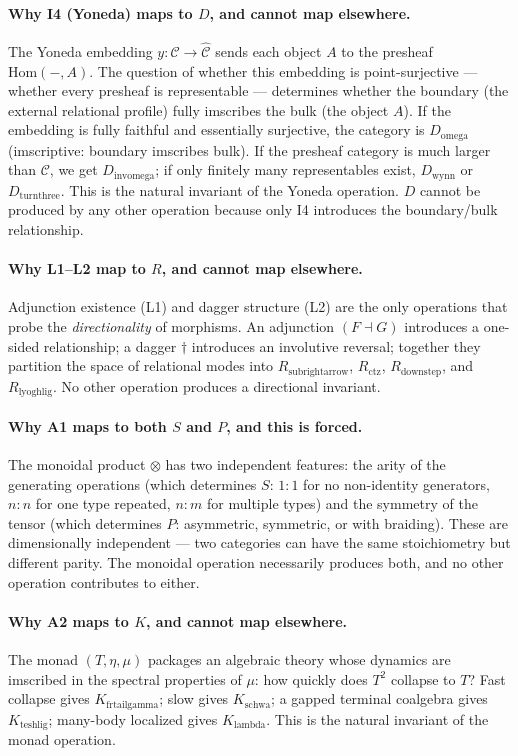 \documentclass[12pt,a4paper]{article}
\begin{document}
\paragraph{Why I4 (Yoneda) maps to $D$, and cannot map elsewhere.}
The Yoneda embedding $y: \mathcal{C} \to \hat{\mathcal{C}}$ sends each object $A$ to the presheaf $\text{Hom}(-,A)$. The question of whether this embedding is point-surjective --- whether every presheaf is representable --- determines whether the boundary (the external relational profile) fully imscribes the bulk (the object $A$). If the embedding is fully faithful and essentially surjective, the category is $D_{\text{omega}}$ (imscriptive: boundary imscribes bulk). If the presheaf category is much larger than $\mathcal{C}$, we get $D_{\text{invomega}}$; if only finitely many representables exist, $D_{\text{wynn}}$ or $D_{\text{turnthree}}$. This is the natural invariant of the Yoneda operation. $D$ cannot be produced by any other operation because only I4 introduces the boundary/bulk relationship.

\paragraph{Why L1--L2 map to $R$, and cannot map elsewhere.}
Adjunction existence (L1) and dagger structure (L2) are the only operations that probe the \emph{directionality} of morphisms. An adjunction $(F \dashv G)$ introduces a one-sided relationship; a dagger $\dagger$ introduces an involutive reversal; together they partition the space of relational modes into $R_{\text{subrightarrow}}$, $R_{\text{ctz}}$, $R_{\text{downstep}}$, and $R_{\text{lyoghlig}}$. No other operation produces a directional invariant.

\paragraph{Why A1 maps to both $S$ and $P$, and this is forced.}
The monoidal product $\otimes$ has two independent features: the arity of the generating operations (which determines $S$: $1{:}1$ for no non-identity generators, $n{:}n$ for one type repeated, $n{:}m$ for multiple types) and the symmetry of the tensor (which determines $P$: asymmetric, symmetric, or with braiding). These are dimensionally independent --- two categories can have the same stoichiometry but different parity. The monoidal operation necessarily produces both, and no other operation contributes to either.

\paragraph{Why A2 maps to $K$, and cannot map elsewhere.}
The monad $(T, \eta, \mu)$ packages an algebraic theory whose dynamics are imscribed in the spectral properties of $\mu$: how quickly does $T^2$ collapse to $T$? Fast collapse gives $K_{\text{frtailgamma}}$; slow gives $K_{\text{schwa}}$; a gapped terminal coalgebra gives $K_{\text{teshlig}}$; many-body localized gives $K_{\text{lambda}}$. This is the natural invariant of the monad operation.
\end{document}
